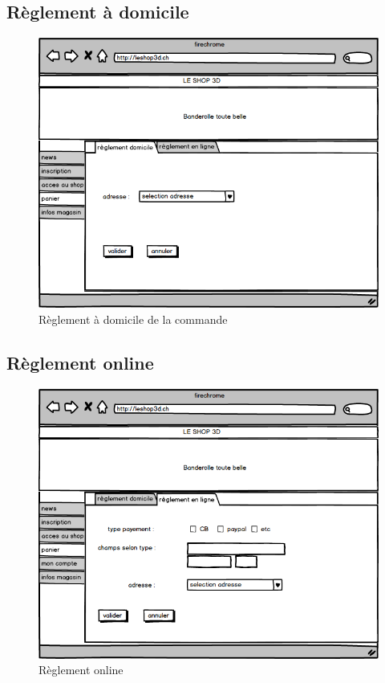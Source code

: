 \documentclass[12pt]{article}
\begin{document}
\subsection{Règlement à domicile}

\begin{figure}[ht]
    \center
    \includegraphics[scale=0.6]{../Maquettes/reglement_domicile.jpeg}
    \caption*{Règlement à domicile de la commande}
\end{figure}

\subsection{Règlement online}

\begin{figure}[ht]
    \center
    \includegraphics[scale=0.6]{../Maquettes/reglement_online.jpeg}
    \caption*{Règlement online}
\end{figure}
\end{document}
